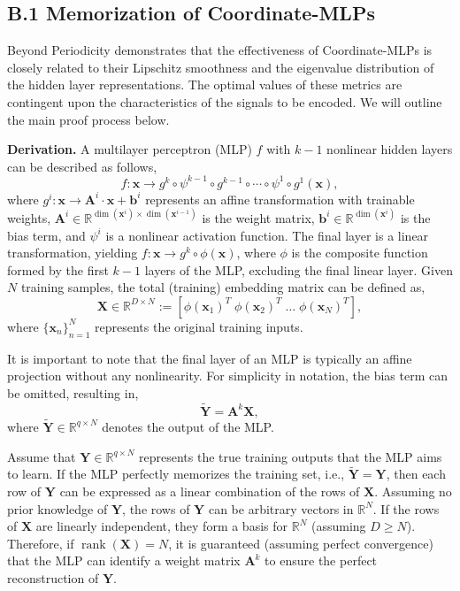 \documentclass[letterpaper]{article} %
\begin{document}
\subsection{B.1 Memorization of Coordinate-MLPs}
\label{memorization_mlps}
Beyond Periodicity \cite{ramasinghe2022activations} demonstrates that the effectiveness of Coordinate-MLPs is closely related to their Lipschitz smoothness and the eigenvalue distribution of the hidden layer representations. The optimal values of these metrics are contingent upon the characteristics of the signals to be encoded. We will outline the main proof process below.

\textbf{Derivation.} A multilayer perceptron (MLP) \( f \) with \( k-1 \) nonlinear hidden layers can be described as follows,
$$
f: \mathbf{x} \rightarrow g^k \circ \psi^{k-1} \circ g^{k-1} \circ \cdots \circ \psi^1 \circ g^1(\mathbf{x}),
$$ where \( g^i: \mathbf{x} \rightarrow \mathbf{A}^i \cdot \mathbf{x} + \mathbf{b}^i \) represents an affine transformation with trainable weights, \(\mathbf{A}^i \in \mathbb{R}^{\operatorname{dim}(\mathbf{x}^i) \times \operatorname{dim}(\mathbf{x}^{i-1})}\) is the weight matrix, \(\mathbf{b}^i \in \mathbb{R}^{\operatorname{dim}(\mathbf{x}^i)}\) is the bias term, and \(\psi^i\) is a nonlinear activation function. The final layer is a linear transformation, yielding \( f: \mathbf{x} \rightarrow g^k \circ \phi(\mathbf{x}) \), where \(\phi\) is the composite function formed by the first \( k-1 \) layers of the MLP, excluding the final linear layer. Given \( N \) training samples, the total (training) embedding matrix can be defined as,
$$
\mathbf{X} \in \mathbb{R}^{D \times N} := \left[\phi(\mathbf{x}_1)^T \; \phi(\mathbf{x}_2)^T \; \ldots \; \phi(\mathbf{x}_N)^T\right],
$$ where \(\{\mathbf{x}_n\}_{n=1}^N\) represents the original training inputs.


It is important to note that the final layer of an MLP is typically an affine projection without any nonlinearity. For simplicity in notation, the bias term can be omitted, resulting in,
$$
\tilde{\mathbf{Y}} = \mathbf{A}^k \mathbf{X},
$$ where \(\tilde{\mathbf{Y}} \in \mathbb{R}^{q \times N}\) denotes the output of the MLP.

Assume that \(\mathbf{Y} \in \mathbb{R}^{q \times N}\) represents the true training outputs that the MLP aims to learn. If the MLP perfectly memorizes the training set, i.e., \(\tilde{\mathbf{Y}} = \mathbf{Y}\), then each row of \(\mathbf{Y}\) can be expressed as a linear combination of the rows of \(\mathbf{X}\). Assuming no prior knowledge of \(\mathbf{Y}\), the rows of \(\mathbf{Y}\) can be arbitrary vectors in \(\mathbb{R}^N\). If the rows of \(\mathbf{X}\) are linearly independent, they form a basis for \(\mathbb{R}^N\) (assuming \(D \geq N\)). Therefore, if \(\operatorname{rank}(\mathbf{X}) = N\), it is guaranteed (assuming perfect convergence) that the MLP can identify a weight matrix \(\mathbf{A}^k\) to ensure the perfect reconstruction of \(\mathbf{Y}\).
\end{document}
